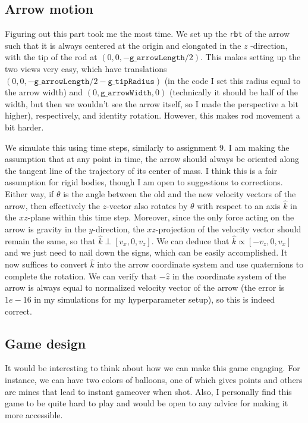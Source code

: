 \documentclass{article}[12pt]
\begin{document}
\subsection{Arrow motion}

Figuring out this part took me the most time. We set up the \texttt{rbt} of the arrow such that it is always centered at the origin and elongated in the $z$
-direction, with the tip of the rod at $(0,0,-\texttt{g\_arrowLength}/2)$. This makes setting up the two views very easy, which have translations $(0,0,-\texttt{g\_arrowLength}/2-\texttt{g\_tipRadius})$ (in the code I set this radius equal to the arrow width) and $(0,\texttt{g\_arrowWidth},0)$ (technically it should be half of the width, but then we wouldn't see the arrow itself, so I made the perspective a bit higher), respectively, and identity rotation.  However, this makes rod movement a bit harder. 

We simulate this using time steps, similarly to assignment 9. 
I am making the assumption that at any point in time, the arrow should always be oriented along the tangent line of the trajectory of its center of mass. I think this is a fair assumption for rigid bodies, though I am open to suggestions to corrections. Either way, if $\theta$ is the angle between the old and the new velocity vectors of the arrow, then effectively the $z$-vector also rotates by $\theta$ with respect to an axis $\hat k$ in the $xz$-plane within this time step. 
Moreover, since the only force acting on the arrow is gravity in the $y$-direction, the $xz$-projection of the velocity vector should remain the same, so that $\hat k\perp[v_x,0,v_z]$. We can deduce that $\hat k \propto[-v_z,0,v_x]$ and we just need to nail down the signs, which can be easily accomplished. It now suffices to convert $\hat k$ into the arrow coordinate system and use quaternions to complete the rotation. We can verify that $-\hat z$ in the coordinate system of the arrow is always equal to normalized velocity vector of the arrow (the error is $1e-16$ in my simulations for my hyperparameter setup), so this is indeed correct. 

\subsection{Game design}

It would be interesting to think about how we can make this game engaging. For instance, we can have two colors of balloons, one of which gives points and others are mines that lead to instant gameover when shot. Also, I personally find this game to be quite hard to play and would be open to any advice for making it more accessible. 
\newpage 
\end{document}

